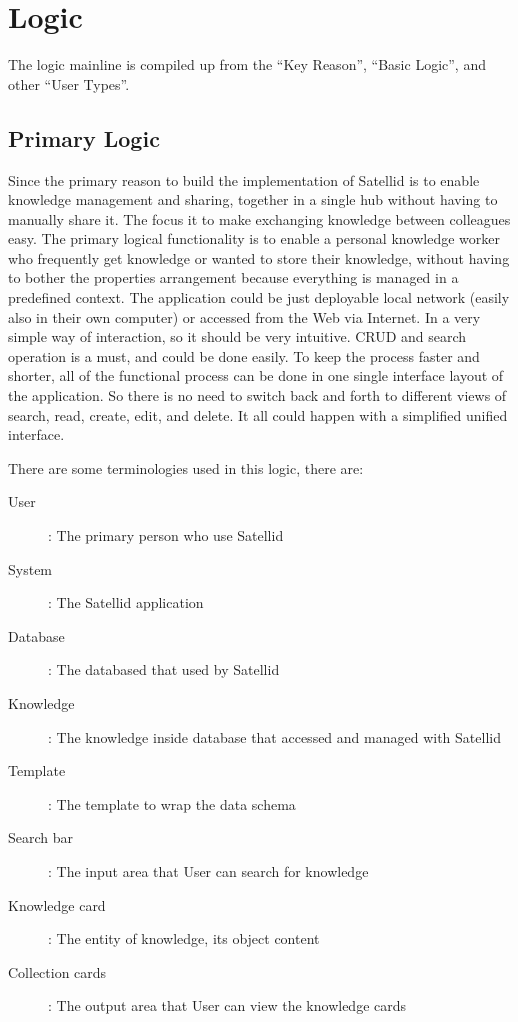 \section{Logic}
\label{sec:logic}

The logic mainline is compiled up from the ``Key Reason'', ``Basic Logic'', and other ``User Types''.

\subsection{Primary Logic}

Since the primary reason to build the implementation of Satellid is to enable knowledge management and sharing, together in a single hub without having to manually share it.
The focus it to make exchanging knowledge between colleagues easy.
The primary logical functionality is to enable a personal knowledge worker who frequently get knowledge or wanted to store their knowledge, without having to bother the properties arrangement because everything is managed in a predefined context.
The application could be just deployable local network (easily also in their own computer) or accessed from the Web via Internet.
In a very simple way of interaction, so it should be very intuitive.
\ac{CRUD} and search operation is a must, and could be done easily.
To keep the process faster and shorter, all of the functional process can be done in one single interface layout of the application.
So there is no need to switch back and forth to different views of search, read, create, edit, and delete.
It all could happen with a simplified unified interface.

\noindent There are some terminologies used in this logic, there are:

\begin{description}
\item [User]: The primary person who use Satellid
\item [System]: The Satellid application
\item [Database]: The databased that used by Satellid
\item [Knowledge]: The knowledge inside database that accessed and managed with Satellid
\item [Template]: The template to wrap the data schema
\item [Search bar]: The input area that User can search for knowledge
\item [Knowledge card]: The entity of knowledge, its object content
\item [Collection cards]: The output area that User can view the knowledge cards
\end{description}


